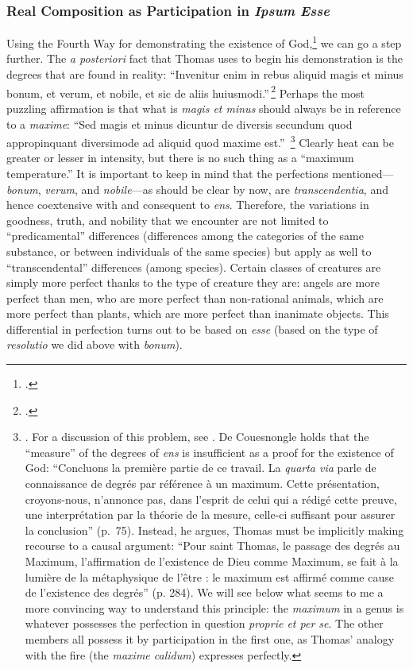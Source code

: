 \subsubsection{Real Composition as Participation in \emph{Ipsum Esse}}

Using the Fourth Way for demonstrating the existence of God,\footcite[See][I, q.~2, a.~3, co.]{st:summa} we can go a step further. The \emph{a posteriori} fact that Thomas uses to begin his demonstration is the degrees that are found in reality: “Invenitur enim in rebus aliquid magis et minus bonum, et verum, et nobile, et sic de aliis huiusmodi.”\,\footcite[I, q.~2, a.~3, co.]{st:summa}
Perhaps the most puzzling affirmation is that what is \emph{magis et minus} should always be in reference to a \emph{maxime}: “Sed magis et minus dicuntur de diversis secundum quod appropinquant diversimode ad aliquid quod maxime est.”\,%
%
\footnote{\Cite[I, q.~2, a.~3, co.]{st:summa}. For a discussion of this problem, see \cite{couesnongle:mesure}. De Couesnongle holds that the “measure” of the degrees of \emph{ens} is insufficient as a proof for the existence of God: “Concluons la première partie de ce travail. La \emph{quarta via} parle de connaissance de degrés par référence à un maximum. Cette présentation, croyons-nous, n’annonce pas, dans l’esprit de celui qui a rédigé cette preuve, une interprétation par la théorie de la mesure, celle-ci suffisant pour assurer la conclusion” (p.~75). Instead, he argues, Thomas must be implicitly making recourse to a causal argument: “Pour saint Thomas, le passage des degrés au Maximum, l’affirmation de l’existence de Dieu comme Maximum, se fait à la lumière de la métaphysique de l’être : le maximum est affirmé comme cause de l’existence des degrés” (p. 284). We will see below what seems to me a more convincing way to understand this principle: the \emph{maximum} in a genus is whatever possesses the perfection in question \emph{proprie et per se}. The other members all possess it by participation in the first one, as Thomas’ analogy with the fire (the \emph{maxime calidum}) expresses perfectly.}
%
Clearly heat can be greater or lesser in intensity, but there is no such thing as a “maximum temperature.” It is important to keep in mind that the perfections mentioned—\emph{bonum}, \emph{verum}, and \emph{nobile}—as should be clear by now, are \emph{transcendentia}, and hence coextensive with and consequent to \emph{ens}. Therefore, the variations in goodness, truth, and nobility that we encounter are not limited to “predicamental” differences (differences among the categories of the same substance, or between individuals of the same species) but apply as well to “transcendental” differences (among species). Certain classes of creatures are simply more perfect thanks to the type of creature they are: angels are more perfect than men, who are more perfect than non-rational animals, which are more perfect than plants, which are more perfect than inanimate objects. This differential in perfection turns out to be based on \emph{esse} (based on the type of \emph{resolutio} we did above with \emph{bonum}).

